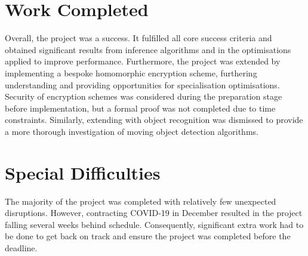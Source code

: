 \section*{Work Completed}
\setlength{\leftskip}{0.25cm}
\indent \indent
Overall, the project was a success. It fulfilled all core success criteria and obtained significant results from inference algorithms and in the optimisations applied to improve performance. Furthermore, the project was extended by implementing a bespoke homomorphic encryption scheme, furthering understanding and providing opportunities for specialisation optimisations. Security of encryption schemes was considered during the preparation stage before implementation, but a formal proof was not completed due to time constraints. Similarly, extending with object recognition was dismissed to provide a more thorough investigation of moving object detection algorithms.

\setlength{\leftskip}{0cm}





\section*{Special Difficulties}
\setlength{\leftskip}{0.25cm}
\indent \indent
The majority of the project was completed with relatively few unexpected disruptions. However, contracting COVID-19 in December resulted in the project falling several weeks behind schedule. Consequently, significant extra work had to be done to get back on track and ensure the project was completed before the deadline. 

\setlength{\leftskip}{0cm}
